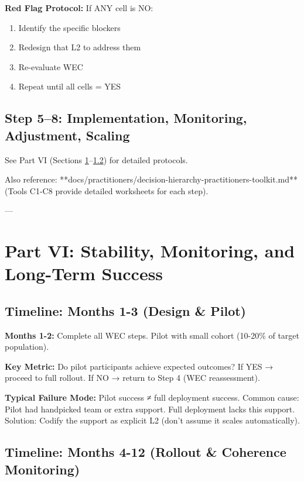 \documentclass[11pt, a4paper]{article}
\begin{document}
\textbf{Red Flag Protocol:} If ANY cell is NO:
\begin{enumerate}
    \item Identify the specific blockers
    \item Redesign that L2 to address them
    \item Re-evaluate WEC
    \item Repeat until all cells = YES
\end{enumerate}

\subsection{Step 5--8: Implementation, Monitoring, Adjustment, Scaling}

See Part VI (Sections \ref{sec:ch15-part6a}--\ref{sec:ch15-part6c}) for detailed protocols.

Also reference: **docs/practitioners/decision-hierarchy-practitioners-toolkit.md** (Tools C1-C8 provide detailed worksheets for each step).

---

\section{Part VI: Stability, Monitoring, and Long-Term Success} \label{sec:ch15-part6a}

\subsection{Timeline: Months 1-3 (Design \& Pilot)} \label{sec:ch15-part6b}

\textbf{Months 1-2:} Complete all WEC steps. Pilot with small cohort (10-20\% of target population).

\textbf{Key Metric:} Do pilot participants achieve expected outcomes? If YES → proceed to full rollout. If NO → return to Step 4 (WEC reassessment).

\textbf{Typical Failure Mode:} Pilot success ≠ full deployment success. Common cause: Pilot had handpicked team or extra support. Full deployment lacks this support. Solution: Codify the support as explicit L2 (don't assume it scales automatically).

\subsection{Timeline: Months 4-12 (Rollout \& Coherence Monitoring)} \label{sec:ch15-part6c}
\end{document}

